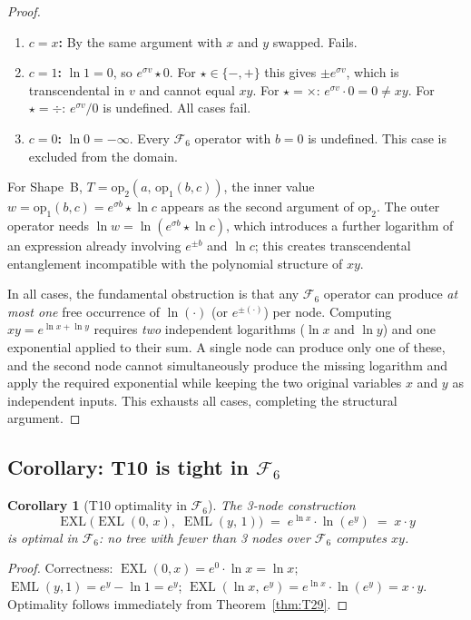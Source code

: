 \documentclass[12pt,a4paper]{article}
\newtheorem{corollary}[theorem]{Corollary}
\theoremstyle{definition}
\newcommand{\EML}{\operatorname{EML}}
\newcommand{\EXL}{\operatorname{EXL}}
\begin{document}
\begin{proof}
\begin{enumerate}
\item \textbf{$c = x$:}
      By the same argument with $x$ and $y$ swapped.  Fails.

\item \textbf{$c = 1$:}
      $\ln 1 = 0$, so $e^{\sigma v}\star 0$.  For $\star\in\{-,+\}$ this gives
      $\pm e^{\sigma v}$, which is transcendental in $v$ and cannot equal $xy$.
      For $\star=\times$: $e^{\sigma v}\cdot 0 = 0 \neq xy$.
      For $\star=\div$: $e^{\sigma v}/0$ is undefined.  All cases fail.

\item \textbf{$c = 0$:}
      $\ln 0 = -\infty$.  Every $\mathcal{F}_6$ operator with $b=0$ is undefined.
      This case is excluded from the domain.
\end{enumerate}

For Shape~B, $T = \mathrm{op}_2(a,\,\mathrm{op}_1(b,c))$, the inner value
$w = \mathrm{op}_1(b,c) = e^{\sigma b}\star\ln c$ appears as the second
argument of $\mathrm{op}_2$.  The outer operator needs $\ln w = \ln(e^{\sigma b}
\star\ln c)$, which introduces a further logarithm of an expression already
involving $e^{\pm b}$ and $\ln c$; this creates transcendental entanglement
incompatible with the polynomial structure of $xy$.

In all cases, the fundamental obstruction is that any $\mathcal{F}_6$ operator
can produce \emph{at most one} free occurrence of $\ln(\cdot)$ (or $e^{\pm(\cdot)}$)
per node.  Computing $xy = e^{\ln x+\ln y}$ requires \emph{two} independent
logarithms ($\ln x$ and $\ln y$) and one exponential applied to their sum.
A single node can produce only one of these, and the second node cannot
simultaneously produce the missing logarithm and apply the required exponential
while keeping the two original variables $x$ and $y$ as independent inputs.
This exhausts all cases, completing the structural argument.
\end{proof}

\subsection{Corollary: T10 is tight in $\mathcal{F}_6$}

\begin{corollary}[T10 optimality in $\mathcal{F}_6$]\label{cor:T10tight}
The 3-node construction
\[
  \EXL\!\bigl(\EXL(0,\,x),\;\EML(y,\,1)\bigr)
  \;=\; e^{\ln x}\cdot\ln(e^y) \;=\; x\cdot y
\]
is \emph{optimal} in $\mathcal{F}_6$: no tree with fewer than 3 nodes over
$\mathcal{F}_6$ computes $xy$.
\end{corollary}
\begin{proof}
Correctness: $\EXL(0,x)=e^0\cdot\ln x=\ln x$;
$\EML(y,1)=e^y-\ln 1=e^y$;
$\EXL(\ln x,\,e^y)=e^{\ln x}\cdot\ln(e^y)=x\cdot y$.
Optimality follows immediately from Theorem~\ref{thm:T29}.
\end{proof}
\end{document}
